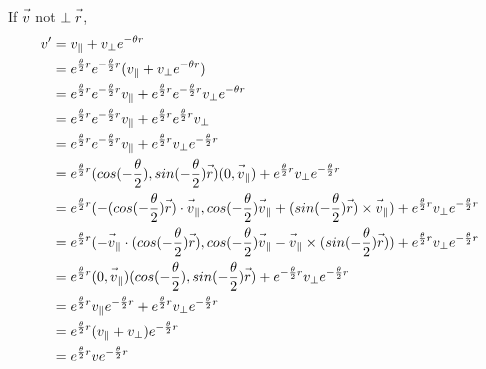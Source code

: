 \documentclass{article}
\newcommand{\fvec}[1]{\vec{\vphantom{A}#1}}
\begin{document}
If $ \fvec{v} $ not $ \perp \fvec{r} $,
\begin{equation}
\begin{split}
    v' & = v_{\parallel} + v_{\perp}e^{-\theta r} \\
       & = e^{\frac{\theta}{2}r}e^{-\frac{\theta}{2} r}(v_{\parallel} + v_{\perp}e^{-\theta r}) \\
       & = e^{\frac{\theta}{2}r}e^{-\frac{\theta}{2} r}v_{\parallel} + e^{\frac{\theta}{2}r}e^{-\frac{\theta}{2} r}v_{\perp}e^{-\theta r} \\
       & = e^{\frac{\theta}{2}r}e^{-\frac{\theta}{2} r}v_{\parallel} + e^{\frac{\theta}{2}r}e^{\frac{\theta}{2} r}v_{\perp} \\
       & = e^{\frac{\theta}{2}r}e^{-\frac{\theta}{2} r}v_{\parallel} + e^{\frac{\theta}{2}r}v_{\perp}e^{-\frac{\theta}{2} r} \\
       & = e^{\frac{\theta}{2}r}(cos(-\frac{\theta}{2}), sin(-\frac{\theta}{2})\fvec{r})(0,\fvec{v}_{\parallel}) + e^{\frac{\theta}{2}r}v_{\perp}e^{-\frac{\theta}{2} r} \\
       & = e^{\frac{\theta}{2}r}(-(cos(-\frac{\theta}{2})\fvec{r}) \cdot \fvec{v}_{\parallel},cos(-\frac{\theta}{2})\fvec{v}_{\parallel} + (sin(-\frac{\theta}{2})\fvec{r}) \times \fvec{v}_{\parallel}) + e^{\frac{\theta}{2}r}v_{\perp}e^{-\frac{\theta}{2} r} \\
       & = e^{\frac{\theta}{2}r}(-\fvec{v}_{\parallel} \cdot (cos(-\frac{\theta}{2})\fvec{r}), cos(-\frac{\theta}{2})\fvec{v}_{\parallel} - \fvec{v}_{\parallel} \times (sin(-\frac{\theta}{2})\fvec{r})) + e^{\frac{\theta}{2}r}v_{\perp}e^{-\frac{\theta}{2} r} \\
       & = e^{\frac{\theta}{2}r}(0,\fvec{v}_{\parallel})(cos(-\frac{\theta}{2}), sin(-\frac{\theta}{2})\fvec{r}) + e^{-\frac{\theta}{2}r}v_{\perp}e^{-\frac{\theta}{2} r} \\
       & = e^{\frac{\theta}{2}r}v_{\parallel}e^{-\frac{\theta}{2} r} + e^{\frac{\theta}{2}r}v_{\perp}e^{-\frac{\theta}{2} r} \\
       & = e^{\frac{\theta}{2}r}(v_{\parallel} + v_{\perp})e^{-\frac{\theta}{2} r} \\
       & = e^{\frac{\theta}{2}r}ve^{-\frac{\theta}{2} r} \\
\end{split}
\end{equation}
\end{document}
